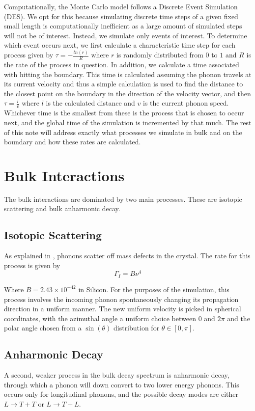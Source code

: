 \documentclass[11pt]{article}
\begin{document}
Computationally, the Monte Carlo model follows a Discrete Event Simulation (DES). We opt for this because simulating discrete time steps of
a given fixed small length is computationally inefficient as a large amount of simulated steps will not be of interest. Instead, we simulate only 
events of interest. To determine which event occurs next, we first calculate a characteristic time step for each process given by 
$\tau = -\frac{ln(r)}{R}$ where $r$ is randomly distributed from $0$ to $1$ and $R$ is the rate of the process in question. In addition, we 
calculate a time associated with hitting the boundary. This time is calculated assuming the phonon travels at its current velocity and thus a simple
calculation is used to find the distance to the closest point on the boundary in the direction of the velocity vector, and then $\tau = \frac{l}{v}$
where $l$ is the calculated distance and $v$ is the current phonon speed. Whichever time is the smallest from these is the process that 
is chosen to occur next, and the global time of the simulation is incremented by that much. The rest of this note will address exactly what processes
we simulate in bulk and on the boundary and how these rates are calculated.

\section*{Bulk Interactions}

The bulk interactions are dominated by two main processes. These are isotopic scattering and bulk anharmonic decay. 

\subsection*{Isotopic Scattering}
As explained in \cite{1}, phonons scatter off mass defects in the crystal. The rate for this process is given by
\begin{equation}
\Gamma_I = B\nu^4
\end{equation}

Where $B = 2.43 \times 10^{-42}$ in Silicon. For the purposes of the simulation, this process involves the incoming phonon spontaneously 
changing its propagation direction in a uniform manner. The new uniform velocity is picked in spherical coordinates, with the azimuthal angle a
uniform choice between $0$ and $2\pi$ and the polar angle chosen from a $\sin(\theta)$ distribution for $\theta \in [0, \pi]$.

\subsection*{Anharmonic Decay}
A second, weaker process in the bulk decay spectrum is anharmonic decay, through which a phonon will down convert to two lower energy
phonons. This occurs only for longitudinal phonons, and the possible decay modes are either $L\rightarrow T+T$ or $L\rightarrow T+L$.
\end{document}
